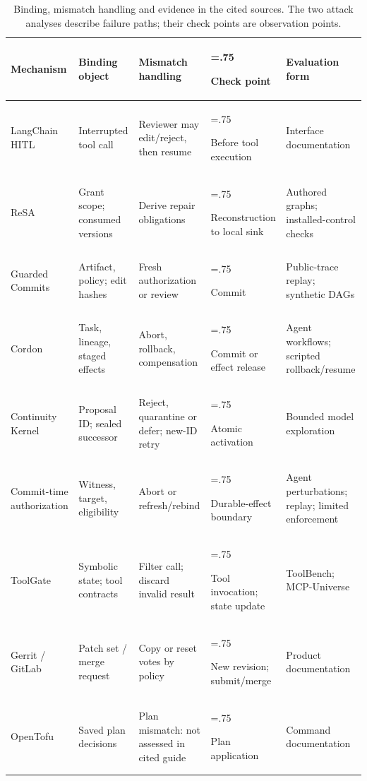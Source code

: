 \begin{table}[tbp]
\caption{Binding, mismatch handling and evidence in the cited sources. The two attack analyses describe failure paths; their check points are observation points.}\label{tab:related}
\centering\footnotesize
\setlength{\tabcolsep}{2.5pt}
\renewcommand{\arraystretch}{1.05}
\begin{tabularx}{\textwidth}{@{}>{\hsize=1.05\hsize\raggedright\arraybackslash}X>{\hsize=1.0\hsize\raggedright\arraybackslash}X>{\hsize=1.05\hsize\raggedright\arraybackslash}X>{\hsize=.75\hsize\raggedright\arraybackslash}X>{\hsize=1.15\hsize\raggedright\arraybackslash}X@{}}
\toprule
Mechanism & Binding object & Mismatch handling & Check point & Evaluation form \\
\midrule
LangChain HITL \citep{langchain-hitl} & Interrupted tool call & Reviewer may edit/reject, then resume & Before tool execution & Interface documentation \\
ReSA \citep{zhu2026resa} & Grant scope; consumed versions & Derive repair obligations & Reconstruction to local sink & Authored graphs; installed-control checks \\
Guarded Commits \citep{bindschaedler2026guarded} & Artifact, policy; edit hashes & Fresh authorization or review & Commit & Public-trace replay; synthetic DAGs \\
Cordon \citep{cordon} & Task, lineage, staged effects & Abort, rollback, compensation & Commit or effect release & Agent workflows; scripted rollback/resume \\
Continuity Kernel \citep{continuity-kernel} & Proposal ID; sealed successor & Reject, quarantine or defer; new-ID retry & Atomic activation & Bounded model exploration \\
Commit-time authorization \citep{commit-time-auth} & Witness, target, eligibility & Abort or refresh/rebind & Durable-effect boundary & Agent perturbations; replay; limited enforcement \\
ToolGate \citep{toolgate} & Symbolic state; tool contracts & Filter call; discard invalid result & Tool invocation; state update & ToolBench; MCP-Universe \\
Gerrit / GitLab \citep{gerrit-copy-condition,gerrit-submit-requirements,gitlab-approvals} & Patch set / merge request & Copy or reset votes by policy & New revision; submit/merge & Product documentation \\
OpenTofu \citep{opentofu-plan-apply} & Saved plan decisions & Plan mismatch: not assessed in cited guide & Plan application & Command documentation \\

\end{tabularx}
\end{table}
